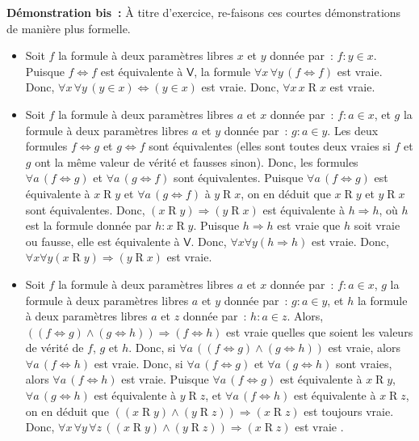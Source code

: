 \noindent\textbf{Démonstration bis :} À titre d'exercice, re-faisons ces courtes démonstrations de manière plus formelle.
\begin{itemize}[nosep]
    \item Soit $f$ la formule à deux paramètres libres $x$ et $y$ donnée par : $f: y \in x$. 
        Puisque $f \Leftrightarrow f$ est équivalente à $\mathsf{V}$, la formule $\forall x \, \forall y \, (f \Leftrightarrow f)$ est vraie. 
        Donc, $\forall x \, \forall y \, (y \in x) \Leftrightarrow (y \in x)$ est vraie.
        Donc, $\forall x \, x \mathrel{R} x$ est vraie.
    \item Soit $f$ la formule à deux paramètres libres $a$ et $x$ donnée par : $f: a \in x$, et $g$ la formule à deux paramètres libres $a$ et $y$ donnée par : $g: a \in y$. 
        Les deux formules $f \Leftrightarrow g$ et $g \Leftrightarrow f$ sont équivalentes (elles sont toutes deux vraies si $f$ et $g$ ont la même valeur de vérité et fausses sinon). 
        Donc, les formules $\forall a \, (f \Leftrightarrow g)$ et $\forall a \, (g \Leftrightarrow f)$ sont équivalentes. 
        Puisque $\forall a \, (f \Leftrightarrow g)$ est équivalente à $x \mathrel{R} y$ et $\forall a \, (g \Leftrightarrow f)$ à $y \mathrel{R} x$, on en déduit que $x \mathrel{R} y$ et $y \mathrel{R} x$ sont équivalentes. 
        Donc, $(x \mathrel{R} y) \Rightarrow (y \mathrel{R} x)$ est équivalente à $h \Rightarrow h$, où $h$ est la formule donnée par $h: x \mathrel{R} y$.
        Puisque $h \Rightarrow h$ est vraie que $h$ soit vraie ou fausse, elle est équivalente à $\mathsf{V}$. 
        Donc, $\forall x \forall y (h \Rightarrow h)$ est vraie.
        Donc, $\forall x \forall y (x \mathrel{R} y) \Rightarrow (y \mathrel{R} x)$ est vraie.
    \item Soit $f$ la formule à deux paramètres libres $a$ et $x$ donnée par : $f: a \in x$, $g$ la formule à deux paramètres libres $a$ et $y$ donnée par : $g: a \in y$, et $h$ la formule à deux paramètres libres $a$ et $z$ donnée par : $h: a \in z$. 
        Alors, $((f \Leftrightarrow g) \wedge (g \Leftrightarrow h)) \Rightarrow (f \Leftrightarrow h)$ est vraie quelles que soient les valeurs de vérité de $f$, $g$ et $h$. 
        Donc, si $\forall a \, ((f \Leftrightarrow g) \wedge (g \Leftrightarrow h))$ est vraie, alors $\forall a \, (f \Leftrightarrow h)$ est vraie.
        Donc, si $\forall a \, (f \Leftrightarrow g)$ et $\forall a \, (g \Leftrightarrow h)$ sont vraies, alors $\forall a \, (f \Leftrightarrow h)$ est vraie.
        Puisque $\forall a \, (f \Leftrightarrow g)$ est équivalente à $x \mathrel{R} y$, $\forall a \, (g \Leftrightarrow h)$ est équivalente à $y \mathrel{R} z$, et $\forall a \, (f \Leftrightarrow h)$ est équivalente à $x \mathrel{R} z$, on en déduit que $((x \mathrel{R} y) \wedge (y \mathrel{R} z)) \Rightarrow (x \mathrel{R} z)$ est toujours vraie.
        Donc, $\forall x \, \forall y \, \forall z \, ((x \mathrel{R} y) \wedge (y \mathrel{R} z)) \Rightarrow (x \mathrel{R} z)$ est vraie .
\end{itemize}

